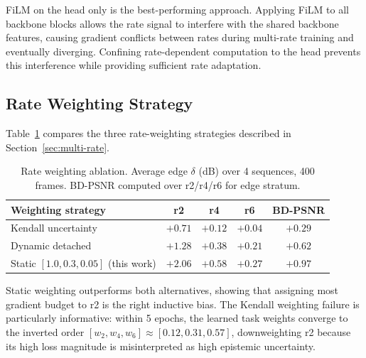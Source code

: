 FiLM on the head only is the best-performing approach.
Applying FiLM to all backbone blocks allows the rate signal to interfere with
the shared backbone features, causing gradient conflicts between rates during
multi-rate training and eventually diverging.
Confining rate-dependent computation to the head prevents this interference
while providing sufficient rate adaptation.

\subsection{Rate Weighting Strategy}
\label{ssec:ablation-weighting}

Table~\ref{tab:ablation-weights} compares the three rate-weighting strategies
described in Section~\ref{sec:multi-rate}.

\begin{table}[t]
  \centering
  \caption{%
    Rate weighting ablation.
    Average edge $\delta$ (dB) over 4 sequences, 400 frames.
    BD-PSNR computed over r2/r4/r6 for edge stratum.
  }
  \label{tab:ablation-weights}
  \begin{tabular}{lcccc}
    \toprule
    Weighting strategy & r2 & r4 & r6 & BD-PSNR \\
    \midrule
    Kendall uncertainty & $+0.71$ & $+0.12$ & $+0.04$ & $+0.29$ \\
    Dynamic detached    & $+1.28$ & $+0.38$ & $+0.21$ & $+0.62$ \\
    Static $[1.0, 0.3, 0.05]$ (this work) & $\mathbf{+2.06}$ & $\mathbf{+0.58}$ & $+0.27$ & $\mathbf{+0.97}$ \\
    \bottomrule
  \end{tabular}
\end{table}

Static weighting outperforms both alternatives, showing that assigning most
gradient budget to r2 is the right inductive bias.
The Kendall weighting failure is particularly informative: within 5 epochs,
the learned task weights converge to the inverted order
$[w_2, w_4, w_6] \approx [0.12, 0.31, 0.57]$, downweighting r2 because its
high loss magnitude is misinterpreted as high epistemic uncertainty.

